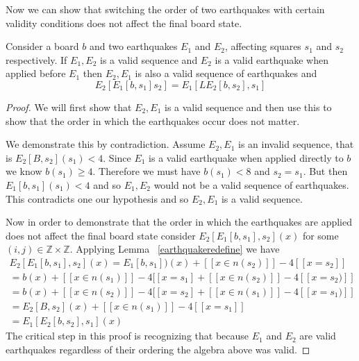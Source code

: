\documentclass[runningheads,a4paper]{llncs}
\begin{document}
Now we can show that switching the order of two earthquakes with certain validity conditions does not affect the final board state.
\begin{lemma}
\label{swappinglemma}
Consider a board $b$ and two earthquakes $E_1$ and $E_2$, affecting squares $s_1$ and $s_2$ respectively. If $E_1, E_2$ is a valid sequence and $E_2$ is a valid earthquake when applied before $E_1$ then $E_2, E_1$ is also a valid sequence of earthquakes and 
\begin{equation*}
E_2[E_1[b, s_1] s_2] = E_1[LE_2[b, s_2], s_1] 
\end{equation*}
\end{lemma}
\begin{proof}
We will first show that $E_2, E_1$ is a valid sequence and then use this to show that the order in which the earthquakes occur does not matter. 

We demonstrate this by contradiction. Assume  $E_2, E_1$ is an invalid sequence, that is $E_2[B, s_2](s_1)<4$. Since $E_1$ is a valid earthquake when applied directly to $b$ we know $b(s_1) \geq 4 $. 
Therefore we must have $b(s_1)<8$ and $s_2=s_1$. But then $E_1[b, s_1](s_1)<4$ and so $E_1, E_2$ would not be a valid sequence of earthquakes. This contradicts one our hypothesis and so $E_2, E_1$ is a valid sequence. 

Now in order to demonstrate that the order in which the earthquakes are applied does not affect the final board state consider $E_2[ E_1[b, s_1], s_2](x)$ for some $(i,j) \in \mathbb{Z} \times \mathbb{Z}$. Applying Lemma ~\ref{earthquakeredefine} we have 
\begin{align*}
E_2[E_1[b, s_1], s_2](x) = E_1[b, s_1])(x)  + [[ x \in n(s_2) ]] - 4[[ x=s_2]] \\
= b(x) + [[ x \in n(s_1) ]] - 4[[x = s_1] + [[ x \in n(s_2) ]] - 4[[ x= s_2)]]  \\
= b(x) + [[ x \in n(s_2) ]] - 4[[x = s_2] + [[ x \in n(s_1) ]] - 4[[ x= s_1)]]\\
= E_2[B, s_2](x) + [[ x \in n(s_1) ]] - 4[[ x = s_1]] \\
= E_1[E_2 [b, s_2], s_1](x) 
\end{align*}
The critical step in this proof is recognizing that because $E_1$ and $E_2$ are valid earthquakes regardless of their ordering the algebra above was valid.
\end{proof}
\end{document}
